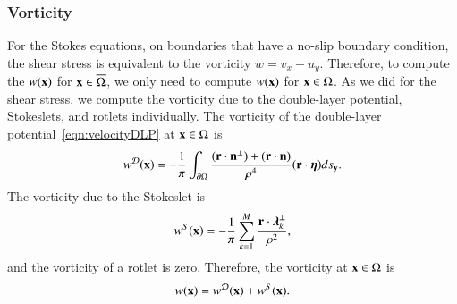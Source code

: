 \documentclass[preprint, 10pt]{elsarticle}
\begin{document}
\subsubsection{Vorticity}
For the Stokes equations, on boundaries that have a no-slip boundary
condition, the shear stress is equivalent to the vorticity $w = v_x -
u_y$.  Therefore, to compute the $w({\mathbf{x}})$ for ${\mathbf{x}} \in
\overline{\Omega}$, we only need to compute $w({\mathbf{x}})$ for ${\mathbf{x}} \in
\Omega$.  As we did for the shear stress, we compute the vorticity due
to the double-layer potential, Stokeslets, and rotlets individually.
The vorticity of the double-layer potential~\eqref{eqn:velocityDLP} at
${\mathbf{x}} \in \Omega$ is
\begin{align}
  w^{{\mathcal{D}}}({\mathbf{x}}) = -\frac{1}{\pi}\int_{{\partial}\Omega} 
    \frac{({\mathbf{r}} \cdot {\mathbf{n}}^\perp) + ({\mathbf{r}} \cdot {\mathbf{n}})}{\rho^4}
    ({\mathbf{r}} \cdot {\boldsymbol\eta}) ds_{{\mathbf{y}}}.
  \label{eqn:vorticityDLP}
\end{align}
The vorticity due to the Stokeslet is
\begin{align*}
  w^S({\mathbf{x}}) = -\frac{1}{\pi} \sum_{k=1}^{M} 
    \frac{{\mathbf{r}} \cdot {\boldsymbol\lambda}_k^\perp}{\rho^2},
\end{align*}
and the vorticity of a rotlet is zero.  Therefore, the vorticity at ${\mathbf{x}}
\in \Omega$ is
\begin{align*}
  w({\mathbf{x}}) = w^{\mathcal{D}}({\mathbf{x}}) + w^S({\mathbf{x}}).
\end{align*}


\end{document}
